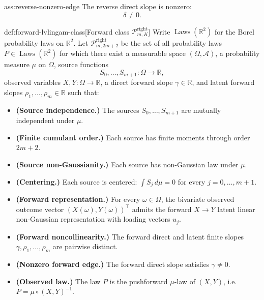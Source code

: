 \begin{assumptionv}{ass:reverse-nonzero-edge}
The reverse direct slope is nonzero:
\[
\delta\ne 0.
\]
\end{assumptionv}

\begin{definitionv}{def:forward-lvlingam-class}[Forward class \(\mathcal P^{\mathrm{right}}_{m,K}\)]
Write \(\operatorname{Laws}(\mathbb R^2)\) for the Borel probability laws on \(\mathbb R^2\). Let \(\mathcal P^{\mathrm{right}}_{m,2m+2}\) be the set of all probability laws \(P\in \operatorname{Laws}(\mathbb R^2)\) for which there exist a measurable space \((\Omega,\mathcal A)\), a probability measure \(\mu\) on \(\Omega\), source functions
\[
S_0,\ldots,S_{m+1}:\Omega\to\mathbb R,
\]
observed variables \(X,Y:\Omega\to\mathbb R\), a direct forward slope \(\gamma\in\mathbb R\), and latent forward slopes \(\rho_1,\ldots,\rho_m\in\mathbb R\) such that:
\begin{itemize}
\item \textbf{(Source independence.)} The sources \(S_0,\ldots,S_{m+1}\) are mutually independent under \(\mu\).
\item \textbf{(Finite cumulant order.)} Each source has finite moments through order \(2m+2\).
\item \textbf{(Source non-Gaussianity.)} Each source has non-Gaussian law under \(\mu\).
\item \textbf{(Centering.)} Each source is centered: \(\int S_j\,d\mu=0\) for every \(j=0,\ldots,m+1\).
\item \textbf{(Forward representation.)} For every \(\omega\in\Omega\), the bivariate observed outcome vector \((X(\omega),Y(\omega))^\top\) admits the forward \(X\to Y\) latent linear non-Gaussian representation with loading vectors \(u_j\).
\item \textbf{(Forward noncollinearity.)} The forward direct and latent finite slopes \(\gamma,\rho_1,\ldots,\rho_m\) are pairwise distinct.
\item \textbf{(Nonzero forward edge.)} The forward direct slope satisfies \(\gamma\ne 0\).
\item \textbf{(Observed law.)} The law \(P\) is the pushforward \(\mu\)-law of \((X,Y)\), i.e. \(P=\mu\circ (X,Y)^{-1}\).
\end{itemize}
\end{definitionv}

